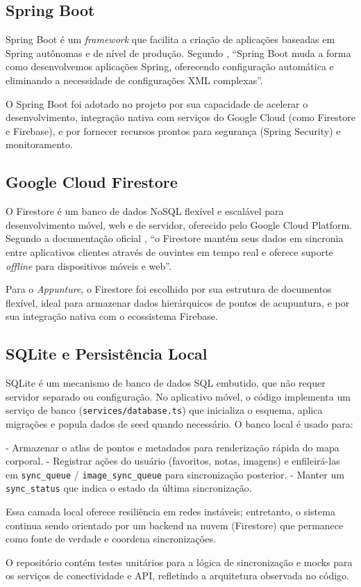 \subsection{Spring Boot}

Spring Boot é um \textit{framework} que facilita a criação de aplicações baseadas em Spring autônomas e de nível de produção. Segundo , ``Spring Boot muda a forma como desenvolvemos aplicações Spring, oferecendo configuração automática e eliminando a necessidade de configurações XML complexas''.

O Spring Boot foi adotado no projeto por sua capacidade de acelerar o desenvolvimento, integração nativa com serviços do Google Cloud (como Firestore e Firebase), e por fornecer recursos prontos para segurança (Spring Security) e monitoramento.

\subsection{Google Cloud Firestore}

O Firestore é um banco de dados NoSQL flexível e escalável para desenvolvimento móvel, web e de servidor, oferecido pelo Google Cloud Platform. Segundo a documentação oficial \cite{google2023}, ``o Firestore mantém seus dados em sincronia entre aplicativos clientes através de ouvintes em tempo real e oferece suporte \textit{offline} para dispositivos móveis e web''.

Para o \textit{Appunture}, o Firestore foi escolhido por sua estrutura de documentos flexível, ideal para armazenar dados hierárquicos de pontos de acupuntura, e por sua integração nativa com o ecossistema Firebase.

\subsection{SQLite e Persistência Local}

SQLite é um mecanismo de banco de dados SQL embutido, que não requer servidor separado ou configuração. No aplicativo móvel, o código implementa um serviço de banco (\texttt{services/database.ts}) que inicializa o esquema, aplica migrações e popula dados de seed quando necessário. O banco local é usado para:

- Armazenar o atlas de pontos e metadados para renderização rápida do mapa corporal.
- Registrar ações do usuário (favoritos, notas, imagens) e enfileirá-las em \texttt{sync\_queue} / \texttt{image\_sync\_queue} para sincronização posterior.
- Manter um \texttt{sync\_status} que indica o estado da última sincronização.

Essa camada local oferece resiliência em redes instáveis; entretanto, o sistema continua sendo orientado por um backend na nuvem (Firestore) que permanece como fonte de verdade e coordena sincronizações.

O repositório contém testes unitários para a lógica de sincronização e mocks para os serviços de conectividade e API, refletindo a arquitetura observada no código.
